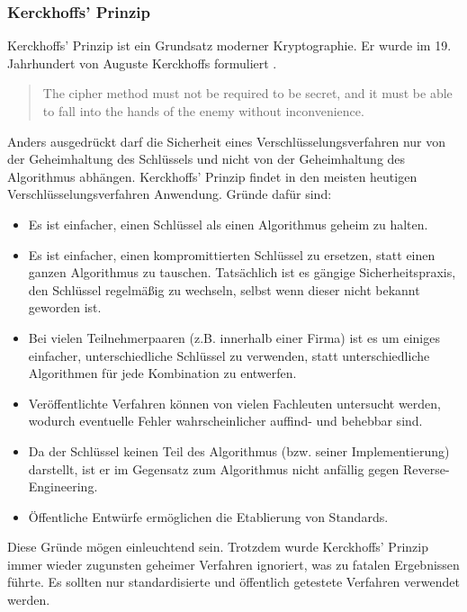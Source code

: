 \subsubsection{Kerckhoffs' Prinzip}

Kerckhoffs' Prinzip ist ein Grundsatz moderner Kryptographie. Er wurde im 19. Jahrhundert von Auguste Kerckhoffs formuliert \cite{Kerckhoffs}.
\begin{quote}
	\grqq{}The cipher method must not be required to be secret, and it must be able to fall into the hands of the enemy without inconvenience.\grqq
\end{quote}
Anders ausgedrückt darf die Sicherheit eines Verschlüsselungsverfahren nur von der Geheimhaltung des Schlüssels und nicht von der Geheimhaltung des Algorithmus abhängen.
Kerckhoffs' Prinzip findet in den meisten heutigen Verschlüsselungsverfahren Anwendung. Gründe dafür sind:
\begin{itemize}
	\item Es ist einfacher, einen Schlüssel als einen Algorithmus geheim zu halten.
	\item Es ist einfacher, einen kompromittierten Schlüssel zu ersetzen, statt einen ganzen Algorithmus zu tauschen. Tatsächlich ist es gängige Sicherheitspraxis, den Schlüssel regelmäßig zu wechseln, selbst wenn dieser nicht bekannt geworden ist.
	\item Bei vielen Teilnehmerpaaren (z.B. innerhalb einer Firma) ist es um einiges einfacher, unterschiedliche Schlüssel zu verwenden, statt unterschiedliche Algorithmen für jede Kombination zu entwerfen.
	\item Veröffentlichte Verfahren können von vielen Fachleuten untersucht werden, wodurch eventuelle Fehler wahrscheinlicher auffind- und behebbar sind.
	\item Da der Schlüssel keinen Teil des Algorithmus (bzw. seiner Implementierung) darstellt, ist er im Gegensatz zum Algorithmus nicht anfällig gegen Reverse-Engineering.
	\item Öffentliche Entwürfe ermöglichen die Etablierung von Standards.
\end{itemize}
Diese Gründe mögen einleuchtend sein. Trotzdem wurde Kerckhoffs' Prinzip immer wieder zugunsten geheimer Verfahren ignoriert, was zu fatalen Ergebnissen führte. Es sollten nur standardisierte und öffentlich getestete Verfahren verwendet werden.